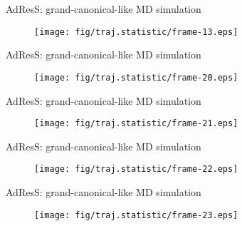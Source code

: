 \documentclass[]{beamer}
\begin{document}
\begin{frame}{AdResS: grand-canonical-like MD simulation}
  \addtocounter{framenumber}{-1}
  \begin{minipage}[t][8cm][t]{1.0\linewidth}
    \begin{figure}[t]
      \centering
      \texttt{[image: fig/traj.statistic/frame-13.eps]}
    \end{figure}
  \end{minipage}
\end{frame}

\begin{frame}{AdResS: grand-canonical-like MD simulation}
  \addtocounter{framenumber}{-1}
  \begin{minipage}[t][8cm][t]{1.0\linewidth}
    \begin{figure}[t]
      \centering
      \texttt{[image: fig/traj.statistic/frame-20.eps]}
    \end{figure}
  \end{minipage}
\end{frame}

\begin{frame}{AdResS: grand-canonical-like MD simulation}
  \addtocounter{framenumber}{-1}
  \begin{minipage}[t][8cm][t]{1.0\linewidth}
    \begin{figure}[t]
      \centering
      \texttt{[image: fig/traj.statistic/frame-21.eps]}
    \end{figure}
  \end{minipage}
\end{frame}

\begin{frame}{AdResS: grand-canonical-like MD simulation}
  \addtocounter{framenumber}{-1}
  \begin{minipage}[t][8cm][t]{1.0\linewidth}
    \begin{figure}[t]
      \centering
      \texttt{[image: fig/traj.statistic/frame-22.eps]}
    \end{figure}
  \end{minipage}
\end{frame}

\begin{frame}{AdResS: grand-canonical-like MD simulation}
  \addtocounter{framenumber}{-1}
  \begin{minipage}[t][8cm][t]{1.0\linewidth}
    \begin{figure}[t]
      \centering
      \texttt{[image: fig/traj.statistic/frame-23.eps]}
    \end{figure}
  \end{minipage}
\end{frame}
\end{document}

